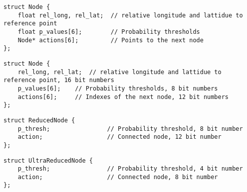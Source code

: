 \begin{lstlisting}[caption={Implementated Node Structure},label={lst:easynode}]
struct Node {
    float rel_long, rel_lat;  // relative longitude and lattidue to reference point
    float p_values[6];        // Probability thresholds
    Node* actions[6];         // Points to the next node
};
\end{lstlisting}
\begin{lstlisting}[caption={Node Structure},label={lst:node}]
struct Node {
    rel_long, rel_lat;  // relative longitude and lattidue to reference point, 16 bit numbers
    p_values[6];    // Probability thresholds, 8 bit numbers
    actions[6];     // Indexes of the next node, 12 bit numbers
};
\end{lstlisting}
\begin{lstlisting}[caption={Reduced Node Structure},label={lst:reducednode}]
struct ReducedNode {
    p_thresh;                // Probability threshold, 8 bit number
    action;                  // Connected node, 12 bit number
};
\end{lstlisting}
\begin{lstlisting}[caption={Ultra Reduced Node Structure},label={lst:ultrareducednode}]
struct UltraReducedNode {
    p_thresh;                // Probability threshold, 4 bit number
    action;                  // Connected node, 8 bit number
};
\end{lstlisting}

